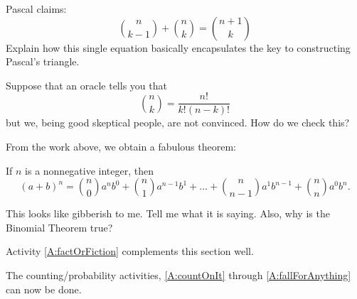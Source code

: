 \begin{question}
Pascal claims:
\[
\binom{n}{k-1} +  \binom{n}{k} = \binom{n+1}{k}
\]
Explain how this single equation basically encapsulates the key
to constructing Pascal's triangle.
\end{question}
\QM

\begin{question}
Suppose that an oracle tells you that
\[
\binom{n}{k} = \frac{n!}{k!(n-k)!}
\]
but we, being good skeptical people, are not convinced. How do we
check this?
\end{question}
\QM

From the work above, we obtain a fabulous theorem:


\begin{theorem} 
If $n$ is a nonnegative integer, then
\[
(a+b)^n = \binom{n}{0} a^nb^0 + \binom{n}{1} a^{n-1}b^1 + \dots + \binom{n}{n-1} a^{1}b^{n-1} + \binom{n}{n} a^{0}b^n.   
\]
\end{theorem}


\begin{question} 
This looks like gibberish to me. Tell me what it is saying. Also, why
is the Binomial Theorem true?
\end{question}
\QM



\begin{activitynote}
Activity \ref{A:factOrFiction} complements this section well.  %
\end{activitynote}




\begin{activitynote}
The counting/probability activities, \ref{A:countOnIt} through \ref{A:fallForAnything} can now be done.
\end{activitynote}



